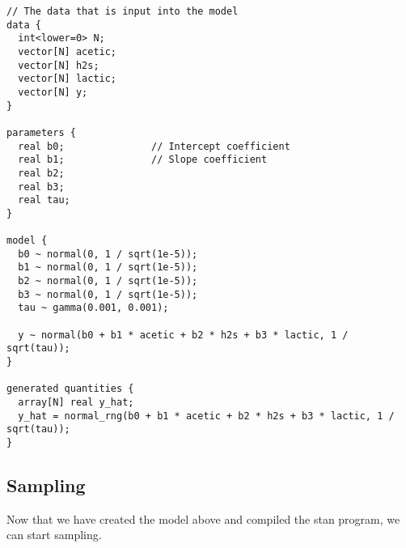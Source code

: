 \documentclass[
  letterpaper,
  DIV=11,
  numbers=noendperiod]{scrreprt}
\newenvironment{Shaded}{\begin{snugshade}}{\end{snugshade}}
\newcommand{\AttributeTok}[1]{\textcolor[rgb]{0.40,0.45,0.13}{#1}}
\newcommand{\CommentTok}[1]{\textcolor[rgb]{0.37,0.37,0.37}{#1}}
\newcommand{\DecValTok}[1]{\textcolor[rgb]{0.68,0.00,0.00}{#1}}
\newcommand{\FunctionTok}[1]{\textcolor[rgb]{0.28,0.35,0.67}{#1}}
\newcommand{\NormalTok}[1]{\textcolor[rgb]{0.00,0.23,0.31}{#1}}
\newcommand{\OtherTok}[1]{\textcolor[rgb]{0.00,0.23,0.31}{#1}}
\newcommand{\SpecialCharTok}[1]{\textcolor[rgb]{0.37,0.37,0.37}{#1}}
\newcommand{\StringTok}[1]{\textcolor[rgb]{0.13,0.47,0.30}{#1}}
\begin{document}
\begin{verbatim}
// The data that is input into the model
data {
  int<lower=0> N;
  vector[N] acetic;
  vector[N] h2s;
  vector[N] lactic;
  vector[N] y;
}

parameters {
  real b0;               // Intercept coefficient
  real b1;               // Slope coefficient
  real b2;
  real b3;
  real tau;
}

model {
  b0 ~ normal(0, 1 / sqrt(1e-5));
  b1 ~ normal(0, 1 / sqrt(1e-5));
  b2 ~ normal(0, 1 / sqrt(1e-5));
  b3 ~ normal(0, 1 / sqrt(1e-5));
  tau ~ gamma(0.001, 0.001);
  
  y ~ normal(b0 + b1 * acetic + b2 * h2s + b3 * lactic, 1 / sqrt(tau));
}

generated quantities {
  array[N] real y_hat;
  y_hat = normal_rng(b0 + b1 * acetic + b2 * h2s + b3 * lactic, 1 / sqrt(tau));
}
\end{verbatim}

\hypertarget{sampling-4}{%
\subsection*{Sampling}\label{sampling-4}}

Now that we have created the model above and compiled the stan program,
we can start sampling.

\begin{Shaded}
\end{Shaded}

\begin{Shaded}
\end{Shaded}
\end{document}
